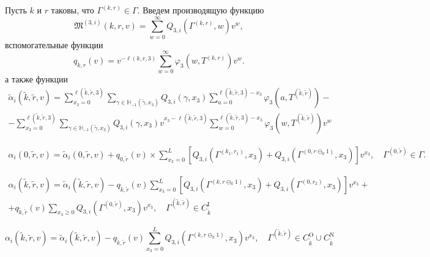 \documentclass[a4paper,12pt,russian]{extarticle}
\begin{document}
Пусть $k$ и $r$ таковы, что $\Gamma^{(k,r)}\in \Gamma$. Введем производящую функцию
\begin{equation*}
\mathfrak{M}^{(3,i)}(k,r,v) = \sum_{w=0}^{\infty} Q_{3,i}(\Gamma^{(k,r)},w) v^w,
\end{equation*}
вспомогательные функции
\begin{equation*}
q_{k,r}(v) = v^{-\ell(k,r,3)}\sum_{w=0}^{\infty} \varphi_3(w,T^{(k,r)})v^w.
\end{equation*}
а также функции
\begin{multline}
\tilde{\alpha}_i(\tilde{k},\tilde{r},v) = \sum_{x_3=0}^{\ell(\tilde{k},\tilde{r},3)}\sum_{\gamma \in {\mathbb H}_{-1}(\tilde{\gamma},x_3)} Q_{3,i}(\gamma,x_3) \sum_{a=0}^{\ell(\tilde{k},\tilde{r},3) - x_3} \varphi_3(a,T^{(\tilde{k},\tilde{r})}) - \\
- \sum_{x_3=0}^{\ell(\tilde{k},\tilde{r},3)}  \sum_{\gamma \in {\mathbb H}_{-1}(\tilde{\gamma},x_3)} Q_{3,i}(\gamma,x_3) v^{x_3-\ell(\tilde{k},\tilde{r},3)}  \sum_{w=0}^{\ell(\tilde{k},\tilde{r},3) -x_3}
\varphi_3(w,T^{(\tilde{k},\tilde{r})}) v^w
\end{multline}

\begin{multline}
\alpha_i(0,\tilde{r},v) =\tilde{\alpha}_i(0,\tilde{r},v) + q_{0,\tilde{r}}(v) \times \sum_{x_3=0}^{L} \left[ Q_{3,i}(\Gamma^{(k_1,r_1)},x_3) + Q_{3,i}(\Gamma^{(0,r\ominus_0 1)},x_3) \right] v^{x_3}, \quad \Gamma^{(0,\tilde{r})} \in \Gamma.
\end{multline}

\begin{multline}
\alpha_i(\tilde{k},\tilde{r},v) =\tilde{\alpha}_i(\tilde{k},\tilde{r},v) - q_{\tilde{k},\tilde{r}}(v)\sum_{x_3=0}^{L} \left[ Q_{3,i}(\Gamma^{(k,r\ominus_k 1)},x_3) + Q_{3,i}(\Gamma^{(0,r_2)},x_3) \right] v^{x_3}+ \\ 
+ q_{\tilde{k},\tilde{r}}(v)  \sum_{x_3\geqslant 0} Q_{3,i}(\Gamma^{(0,\tilde{r})},x_3) v^{x_3}, \quad \Gamma^{(\tilde{k}, \tilde{r})} \in C_{\tilde{k}}^{\mathrm{I}}
\end{multline}

\begin{equation}
\alpha_i(\tilde{k},\tilde{r},v) =\tilde{\alpha}_i(\tilde{k},\tilde{r},v) - q_{\tilde{k},\tilde{r}}(v) \sum_{x_3=0}^{L} Q_{3,i}(\Gamma^{(k,r\ominus_k 1)},x_3) v^{x_3} , \quad \Gamma^{(\tilde{k}, \tilde{r})} \in C_{\tilde{k}}^{\mathrm{O}} \cup C_{\tilde{k}}^{\mathrm{N}}
\end{equation}
\end{document}
